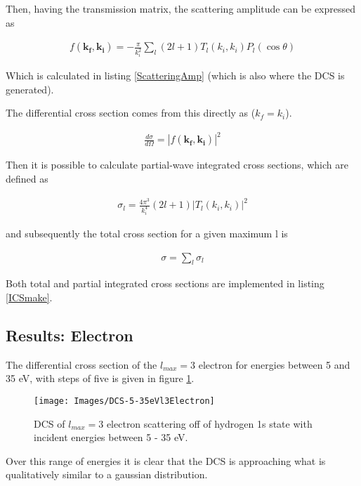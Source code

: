 \documentclass{article}
\renewcommand{\vec}[1]{\mathbf{#1}}
\begin{document}
    Then, having the transmission matrix, the scattering amplitude can be expressed as
    
    \begin{gather}
    	f(\vec{k_f}, \vec{k_i}) = -\frac{\pi}{k_i^2}\sum_{l}(2l+1)T_l(k_i, k_i)P_l(\cos\theta)
    \end{gather}
    
    Which is calculated in listing \ref{ScatteringAmp} (which is also where the DCS is generated).
    
    The differential cross section comes from this directly as ($k_f = k_i$). 
    
    \begin{gather}
    	\frac{d\sigma}{d\Omega} = |f(\vec{k_f}, \vec{k_i})|^2
    \end{gather}
    
    Then it is possible to calculate partial-wave integrated cross sections, which are defined as 
    
    \begin{gather}
    	\sigma_l = \frac{4\pi^3}{k_i^4}(2l+1)|T_l(k_i, k_i)|^2
    \end{gather}
    
    and subsequently the total cross section for a given maximum l is 
    
    \begin{gather}
    	\sigma = \sum_l \sigma_l    
    \end{gather}
    
    Both total and partial integrated cross sections are implemented in listing \ref{ICSmake}. 
    
    \subsection{Results: Electron}
    
    The differential cross section of the $l_{max}=3$ electron for energies between 5 and 35 eV, with steps of five is given in figure \ref{5-35l3Electron}. 
    
    \begin{figure}[H]
    	\centering
    	\texttt{[image: Images/DCS-5-35eVl3Electron]}
    	\caption{DCS of $l_{max}=3$ electron scattering off of hydrogen 1s state with incident energies between 5 - 35 eV. \label{5-35l3Electron}}
    \end{figure}
    
    Over this range of energies it is clear that the DCS is approaching what is qualitatively similar to a gaussian distribution. 
    
\end{document}
